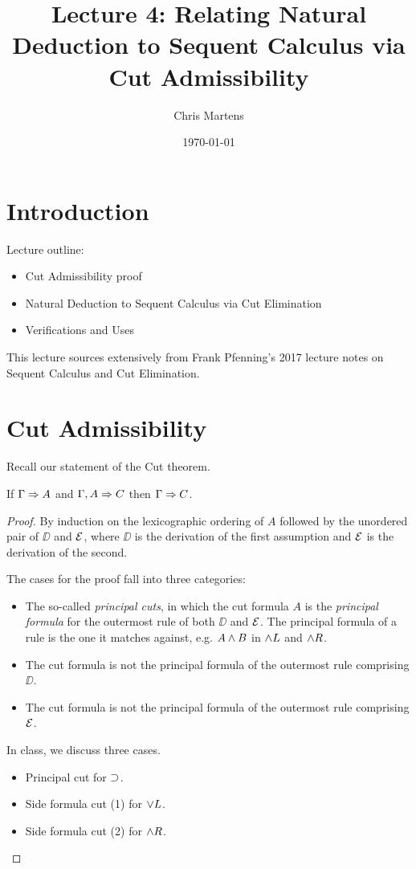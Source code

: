 \documentclass{article}
\title{Lecture 4: Relating Natural Deduction to Sequent Calculus via Cut
Admissibility}
\author{Chris Martens}
\date{\today}
\begin{document}
\maketitle

\section{Introduction}

Lecture outline:
\begin{itemize}
    \item Cut Admissibility proof
    \item Natural Deduction to Sequent Calculus via Cut Elimination
    \item Verifications and Uses
\end{itemize}

This lecture sources extensively from Frank Pfenning's 2017 lecture notes
on Sequent Calculus and Cut Elimination.

\section{Cut Admissibility}

Recall our statement of the Cut theorem.

\begin{theorem}[Cut]
  If $\Gamma \Rightarrow A$ and $\Gamma, A \Rightarrow C$ then $\Gamma \Rightarrow C$.
\end{theorem}

\begin{proof}
  By induction on the lexicographic ordering of $A$ followed
  by the unordered pair of $\DD$ and $\mathcal{E}$, where $\DD$ is the derivation
  of the first assumption and $\mathcal{E}$ is the derivation of the second.

  The cases for the proof fall into three categories:
  \begin{itemize}
    \item The so-called {\em principal cuts}, in which the cut formula 
      $A$ is the {\em principal formula} for the outermost rule of both 
      $\DD$ and $\mathcal{E}$. 
      The principal formula of a rule is the one it matches against,
      e.g. $A \wedge B$ in $\wedge L$ and $\wedge R$.
    \item The cut formula is not the principal formula of the outermost
      rule comprising $\DD$.
    \item The cut formula is not the principal formula of the outermost
      rule comprising $\mathcal{E}$.
  \end{itemize}

  In class, we discuss three cases.
  \begin{itemize}
    \item Principal cut for $\supset$.
    \item Side formula cut (1) for $\vee L$.
    \item Side formula cut (2) for $\wedge R$.
  \end{itemize}
\end{proof}
\end{document}

